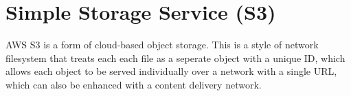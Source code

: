 \chapter{Simple Storage Service (S3)}\label{ch:simple-storage-service}

AWS S3 is a form of cloud-based object storage. This is a style of network filesystem that treats each each file as a seperate object with a unique ID, which allows each object to be served individually over a network with a single URL, which can also be enhanced with a content delivery network.
